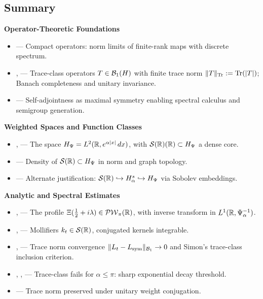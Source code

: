 \subsection*{Summary}
\label{sec:foundations_summary}

\textbf{Operator-Theoretic Foundations}
\begin{itemize}
  \item {} — Compact operators: norm limits of finite-rank maps with discrete spectrum.
  \item {},  — Trace-class operators \( T \in \mathcal{B}_1(H) \) with finite trace norm \( \|T\|_{\operatorname{Tr}} := \operatorname{Tr}(|T|) \); Banach completeness and unitary invariance.
  \item {} — Self-adjointness as maximal symmetry enabling spectral calculus and semigroup generation.
\end{itemize}

\textbf{Weighted Spaces and Function Classes}
\begin{itemize}
  \item {},  — The space \( H_{\Psi} = L^2(\mathbb{R}, e^{\alpha|x|}\,dx) \), with \( \mathcal{S}(\mathbb{R})(\mathbb{R}) \subset H_{\Psi} \) a dense core.
  \item {} — Density of \( \mathcal{S}(\mathbb{R}) \subset H_{\Psi} \) in norm and graph topology.
  \item {} — Alternate justification: \( \mathcal{S}(\mathbb{R}) \hookrightarrow H^s_\alpha \hookrightarrow H_{\Psi} \) via Sobolev embeddings.
\end{itemize}

\textbf{Analytic and Spectral Estimates}
\begin{itemize}
  \item {},  — The profile \( \Xi(\tfrac{1}{2} + i\lambda) \in \mathcal{PW}_{\pi}(\mathbb{R}) \), with inverse transform in \( L^1(\mathbb{R}, \Psi_\alpha^{-1}) \).
  \item {},  — Mollifiers \( k_t \in \mathcal{S}(\mathbb{R}) \), conjugated kernels integrable.
  \item {},  — Trace norm convergence \( \|L_t - L_{\mathrm{sym}}\|_{\mathcal{B}_1} \to 0 \) and Simon's trace-class inclusion criterion.
  \item {}, ,  — Trace-class fails for \( \alpha \le \pi \): sharp exponential decay threshold.
  \item {} — Trace norm preserved under unitary weight conjugation.
\end{itemize}

